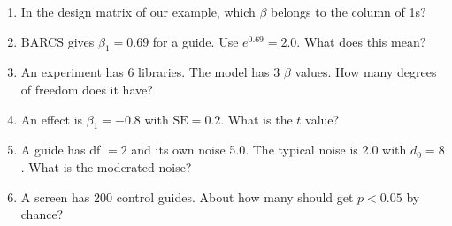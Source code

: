 \documentclass[12pt]{article}
\begin{document}
\begin{enumerate}[label=\textbf{Q\arabic*.},leftmargin=2.6em,itemsep=6pt]
\item In the design matrix of our example, which $\beta$ belongs to the
column of 1s?

\item BARCS gives $\beta_1 = 0.69$ for a guide. Use $e^{0.69} = 2.0$. What
does this mean?

\item An experiment has 6 libraries. The model has 3 $\beta$ values. How many
degrees of freedom does it have?

\item An effect is $\beta_1 = -0.8$ with $\text{SE} = 0.2$. What is the $t$
value?

\item A guide has df $= 2$ and its own noise 5.0. The typical noise is 2.0
with $d_0 = 8$. What is the moderated noise?

\item A screen has 200 control guides. About how many should get $p < 0.05$
by chance?


\end{enumerate}
\end{document}
